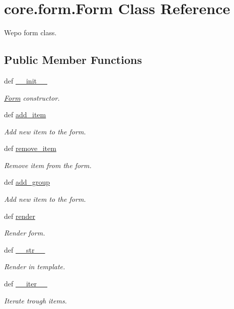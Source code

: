 \hypertarget{classcore_1_1form_1_1Form}{\section{core.\-form.\-Form Class Reference}
\label{classcore_1_1form_1_1Form}
}


Wepo form class.  


\subsection*{Public Member Functions}
\begin{DoxyCompactItemize}
\item 
def \hyperlink{classcore_1_1form_1_1Form_a8ffb534c4eb20f7ff59e98f3f78950da}{\-\_\-\-\_\-init\-\_\-\-\_\-}
\begin{DoxyCompactList}\small\item\em \hyperlink{classcore_1_1form_1_1Form}{Form} constructor. \end{DoxyCompactList}\item 
def \hyperlink{classcore_1_1form_1_1Form_a20903823a9d10f7f5731a297a43e5174}{add\-\_\-item}
\begin{DoxyCompactList}\small\item\em Add new item to the form. \end{DoxyCompactList}\item 
def \hyperlink{classcore_1_1form_1_1Form_a42834e70bfd5e0d3234e444aeb9f1e2b}{remove\-\_\-item}
\begin{DoxyCompactList}\small\item\em Remove item from the form. \end{DoxyCompactList}\item 
def \hyperlink{classcore_1_1form_1_1Form_aa1e30c2929cb20f7a99707f2cf877f1f}{add\-\_\-group}
\begin{DoxyCompactList}\small\item\em Add new item to the form. \end{DoxyCompactList}\item 
def \hyperlink{classcore_1_1form_1_1Form_a082e72f90f3ac0e4388a8447c13b1160}{render}
\begin{DoxyCompactList}\small\item\em Render form. \end{DoxyCompactList}\item 
def \hyperlink{classcore_1_1form_1_1Form_ab35349daa612e98cb9c85717cde28e4f}{\-\_\-\-\_\-str\-\_\-\-\_\-}
\begin{DoxyCompactList}\small\item\em Render in template. \end{DoxyCompactList}\item 
def \hyperlink{classcore_1_1form_1_1Form_a5dbfa902ee08b5793b8855b80775a7a5}{\-\_\-\-\_\-iter\-\_\-\-\_\-}
\begin{DoxyCompactList}\small\item\em Iterate trough items. \end{DoxyCompactList}\end{DoxyCompactItemize}
